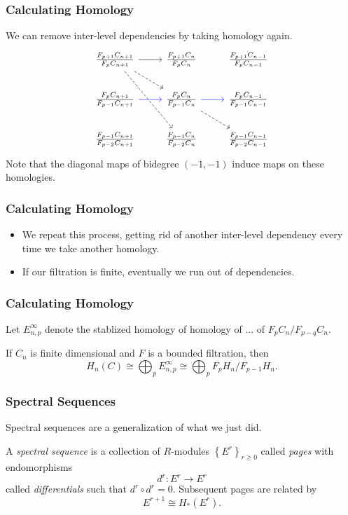 \documentclass{beamer}
\begin{document}
\begin{frame}[fragile]
	\frametitle{Calculating Homology}

	We can remove inter-level dependencies by taking homology again.
	\[
		\begin{tikzcd}
			\frac{F_{p+1}C_{n+1}}{F_{p}C_{n+1}}\rar\arrow[rd,dashed]\arrow[rdd,dashed]&\frac{F_{p+1}C_{n}}{F_{p}C_{n}}&\frac{F_{p+1}C_{n-1}}{F_{p}C_{n-1}}\\
			\frac{F_{p}C_{n+1}}{F_{p-1}C_{n+1}}\rar[blue]&\frac{F_{p}C_{n}}{F_{p-1}C_{n}}\rar[blue]\arrow[rd,dashed]&\frac{F_{p}C_{n-1}}{F_{p-1}C_{n-1}}\\
			\frac{F_{p-1}C_{n+1}}{F_{p-2}C_{n+1}}&\frac{F_{p-1}C_{n}}{F_{p-2}C_{n}}&\frac{F_{p-1}C_{n-1}}{F_{p-2}C_{n-1}}
                \end{tikzcd}
        \]
	Note that the diagonal maps of bidegree $(-1,-1)$ induce maps on these homologies.
\end{frame}

\begin{frame}
	\frametitle{Calculating Homology}

	\begin{itemize}
		\item We repeat this process, getting rid of another inter-level dependency every time we take another homology.
		\item If our filtration is finite, eventually we run out of dependencies.
	\end{itemize}
\end{frame}

\begin{frame}
	\frametitle{Calculating Homology}

	Let $E_{n,p}^{\infty}$ denote the stablized homology of homology of ... of $F_{p}C_{n}/F_{p-q}C_{n}$.

	\vspace{5mm}

	If $C_{n}$ is finite dimensional and $F$ is a bounded filtration, then
	\[
		H_{n}(C) \cong \bigoplus_{p} E_{n,p}^{\infty} \cong \bigoplus_{p} F_{p}H_{n}/F_{p-1}H_{n}.
	\] 
\end{frame}

\begin{frame}
	\frametitle{Spectral Sequences}

	Spectral sequences are a generalization of what we just did.
	\vspace{5mm}

	\begin{definition}
		A \textit{spectral sequence} is a collection of $R$-modules $\left\{ E^{r} \right\}_{r \geq 0}$ called \textit{pages} with endomorphisms
		\[
		d^{r}:E^{r}\to E^{r}
		\] called \textit{differentials} such that $d^{r}\circ d^{r}=0$. Subsequent pages are related by
		\[
			E^{r+1}\cong H_{*}(E^{r}).
		\] 
	\end{definition}
\end{frame}
\end{document}
